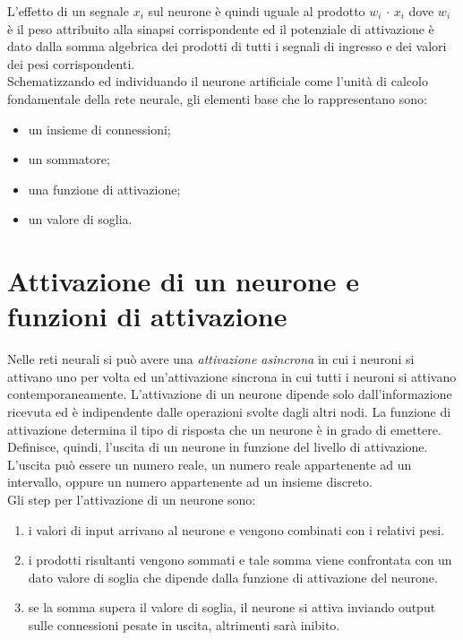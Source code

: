 \documentclass[12pt,a4paper,oneside]{book}
\begin{document}
		L'effetto di un segnale $ x_{i} $ sul neurone è quindi uguale al prodotto 
		$w_{i}$ $\cdot$ $x_{i}$ dove $w_{i}$ è il peso attribuito alla sinapsi corrispondente ed il potenziale di attivazione è dato dalla somma algebrica dei prodotti di tutti i segnali di ingresso e dei valori dei pesi corrispondenti.\\
	 	Schematizzando ed individuando il neurone artificiale come l'unità di calcolo fondamentale della rete neurale, gli elementi base che lo rappresentano sono:
		
		\begin{itemize}
			\item un insieme di connessioni;
			\item un sommatore;
			\item una funzione di attivazione;
			\item un valore di soglia.
		\end{itemize}
		
		
	
	\section{Attivazione di un neurone e funzioni di attivazione}
		
		Nelle reti neurali si può avere una \emph{attivazione asincrona} in cui i neuroni si attivano uno per volta ed un'{attivazione sincrona} in cui tutti i neuroni si attivano contemporaneamente. L'attivazione di un neurone dipende solo dall'informazione ricevuta ed è indipendente dalle operazioni svolte dagli altri nodi. La funzione di attivazione determina il tipo di risposta che un neurone è in grado di emettere. Definisce, quindi, l’uscita di un neurone in funzione del livello di attivazione. L'uscita può essere un numero reale, un numero reale appartenente ad un intervallo, oppure un numero appartenente ad un insieme discreto.\\
		Gli step per l'attivazione di un neurone sono:
		
		\begin{enumerate}
		\item i valori di input arrivano al neurone e vengono combinati con i relativi pesi. 
		\item i prodotti risultanti vengono sommati e tale somma viene confrontata con un dato valore di soglia che dipende dalla funzione di attivazione del neurone.
		\item se la somma supera il valore di soglia, il neurone si attiva inviando output sulle connessioni pesate in uscita, altrimenti sarà inibito.
		\end{enumerate}
	
\end{document}
